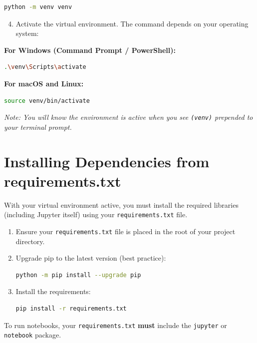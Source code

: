 \documentclass[12pt, a4paper]{article}
\begin{document}
\begin{lstlisting}[language=bash, title={Terminal - Create venv}]
python -m venv venv
\end{lstlisting}

\begin{enumerate}
    \setcounter{enumi}{3}
    \item Activate the virtual environment. The command depends on your operating system:
\end{enumerate}

\textbf{For Windows (Command Prompt / PowerShell):}
\begin{lstlisting}[language=bash]
.\venv\Scripts\activate
\end{lstlisting}

\textbf{For macOS and Linux:}
\begin{lstlisting}[language=bash]
source venv/bin/activate
\end{lstlisting}

\textit{Note: You will know the environment is active when you see \texttt{(venv)} prepended to your terminal prompt.}

\section{Installing Dependencies from requirements.txt}

With your virtual environment active, you must install the required libraries (including Jupyter itself) using your \texttt{requirements.txt} file.

\begin{enumerate}
    \item Ensure your \texttt{requirements.txt} file is placed in the root of your project directory. 
    \item Upgrade pip to the latest version (best practice):
\begin{lstlisting}[language=bash]
python -m pip install --upgrade pip
\end{lstlisting}
    \item Install the requirements:
\begin{lstlisting}[language=bash]
pip install -r requirements.txt
\end{lstlisting}
\end{enumerate}

\begin{tcolorbox}[colback=yellow!10!white, colframe=orange!80!black, title=Crucial Requirement]
To run notebooks, your \texttt{requirements.txt} \textbf{must} include the \texttt{jupyter} or \texttt{notebook} package. 
\end{tcolorbox}
\end{document}
